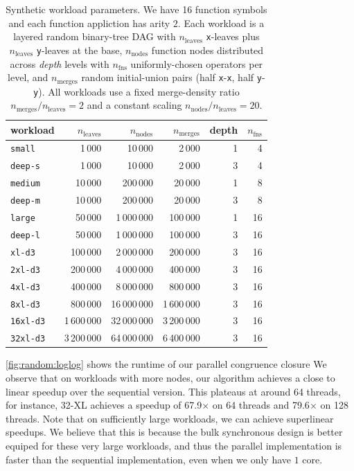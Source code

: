 \begin{table}[t]
  \centering
  \begin{tabular}{l r r r r r}
    \toprule
    workload & $n_{\text{leaves}}$ & $n_{\text{nodes}}$ & $n_{\text{merges}}$ &
    depth & $n_{\text{fns}}$ \\
    \midrule
    \texttt{small}   &      1\,000 &     10\,000 &      2\,000 & 1 &  4 \\
    \texttt{deep-s}  &      1\,000 &     10\,000 &      2\,000 & 3 &  4 \\
    \texttt{medium}  &     10\,000 &    200\,000 &     20\,000 & 1 &  8 \\
    \texttt{deep-m}  &     10\,000 &    200\,000 &     20\,000 & 3 &  8 \\
    \texttt{large}   &     50\,000 &  1\,000\,000 &    100\,000 & 1 & 16 \\
    \texttt{deep-l}  &     50\,000 &  1\,000\,000 &    100\,000 & 3 & 16 \\
    \texttt{xl-d3}   &    100\,000 &  2\,000\,000 &    200\,000 & 3 & 16 \\
    \texttt{2xl-d3}  &    200\,000 &  4\,000\,000 &    400\,000 & 3 & 16 \\
    \texttt{4xl-d3}  &    400\,000 &  8\,000\,000 &    800\,000 & 3 & 16 \\
    \texttt{8xl-d3}  &    800\,000 & 16\,000\,000 & 1\,600\,000 & 3 & 16 \\
    \texttt{16xl-d3} &  1\,600\,000 & 32\,000\,000 & 3\,200\,000 & 3 & 16 \\
    \texttt{32xl-d3} &  3\,200\,000 & 64\,000\,000 & 6\,400\,000 & 3 & 16 \\
    \bottomrule
  \end{tabular}
  \caption{Synthetic workload parameters. We have 16 function symbols and each
  function appliction has arity $2$.
  Each workload is a layered random binary-tree DAG with $n_{\text{leaves}}$
  \texttt{x}-leaves plus $n_{\text{leaves}}$ \texttt{y}-leaves at the base,
  $n_{\text{nodes}}$ function nodes distributed across \emph{depth} levels with
  $n_{\text{fns}}$ uniformly-chosen operators per level, and $n_{\text{merges}}$
  random initial-union pairs (half \texttt{x}-\texttt{x}, half
  \texttt{y}-\texttt{y}). All workloads use a fixed merge-density ratio
  $n_{\text{merges}} / n_{\text{leaves}} = 2$ and a constant scaling
  $n_{\text{nodes}} / n_{\text{leaves}} = 20$.}
  \label{tab:workloads}
\end{table}


\autoref{fig:random:loglog} shows the runtime of our parallel congruence closure
We observe that on workloads with more nodes, our algorithm achieves a close to
linear speedup over the sequential version. This plateaus at around 64 threads,
for instance, 32-XL achieves a speedup of 67.9$\times$ on 64 threads and 79.6$\times$ on 128
threads. Note that on sufficiently large workloads, we can achieve superlinear 
speedups. We believe that this is because the bulk synchronous design is better 
equiped for these very large workloads, and thus the parallel implementation is 
faster than the sequential implementation, even when we only have $1$ core.

